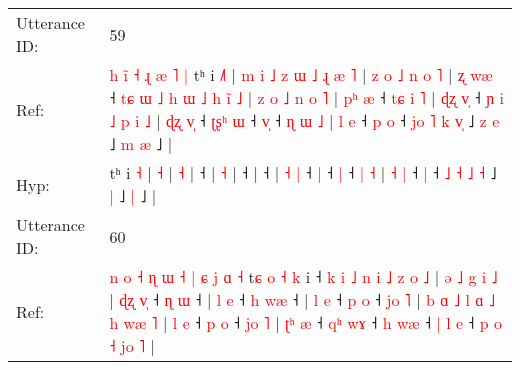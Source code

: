 \documentclass[10pt]{article}
\DeclareRobustCommand{\hl}[1]{{\textcolor{red}{#1}}}
\begin{document}
\begin{longtable}{ll}
 \\
\midrule
Utterance ID: & 59 \\
Ref: & \hl{h}\hl{ }\hl{i}\hl{̃}\hl{ }\hl{˧}\hl{ }\hl{ɻ}\hl{ }\hl{æ}\hl{ }\hl{˥}\hl{ }\hl{|}\hl{ }tʰ i \hl{˩}\hl{˥} |\hl{ }\hl{m}\hl{ }\hl{i}\hl{ }\hl{˩}\hl{ }\hl{z}\hl{ }\hl{ɯ}\hl{ }\hl{˩}\hl{ }\hl{ɻ}\hl{ }\hl{æ} \hl{˥} |\hl{ }\hl{z}\hl{ }\hl{o}\hl{ }\hl{˩}\hl{ }\hl{n}\hl{ }\hl{o} \hl{˥} |\hl{ }\hl{ʐ}\hl{ }\hl{w}\hl{æ} ˧\hl{ }\hl{t}\hl{ɕ}\hl{ }\hl{ɯ}\hl{ }\hl{˩}\hl{ }\hl{h}\hl{ }\hl{ɯ}\hl{ }\hl{˩}\hl{ }\hl{h}\hl{ }\hl{i}\hl{̃}\hl{ }\hl{˩} |\hl{ }\hl{z}\hl{ }\hl{o}\hl{ }\hl{˩}\hl{ }\hl{n}\hl{ }\hl{o} \hl{˥} |\hl{ }\hl{p}\hl{ʰ}\hl{ }\hl{æ} ˧\hl{ }\hl{t}\hl{ɕ}\hl{ }\hl{i}\hl{ }\hl{˥} |\hl{ }\hl{ɖ}\hl{ʐ}\hl{ }\hl{v}\hl{̩} ˧\hl{ }\hl{ɲ}\hl{ }\hl{i}\hl{ }\hl{˩}\hl{ }\hl{p}\hl{ }\hl{i}\hl{ }\hl{˩} | \hl{ɖ}\hl{ʐ} \hl{v}\hl{̩} ˧\hl{ }\hl{ʈ}\hl{ʂ}\hl{ʰ} \hl{ɯ} ˧ \hl{v}\hl{̩} ˧\hl{ }\hl{ɳ} \hl{ɯ} \hl{˩} | \hl{l} \hl{e} ˧\hl{ }\hl{p} \hl{o} ˧ \hl{j}\hl{o} \hl{˥} \hl{k} \hl{v}\hl{̩} ˩\hl{ }\hl{z} \hl{e} ˩\hl{ }\hl{m} \hl{æ} ˩ |
 \\
Hyp: & \hl{}\hl{}\hl{}\hl{}\hl{}\hl{}\hl{}\hl{}\hl{}\hl{}\hl{}\hl{}\hl{}\hl{}\hl{}tʰ i \hl{}\hl{˧} |\hl{}\hl{}\hl{}\hl{}\hl{}\hl{}\hl{}\hl{}\hl{}\hl{}\hl{}\hl{}\hl{}\hl{}\hl{}\hl{} \hl{˧} |\hl{}\hl{}\hl{}\hl{}\hl{}\hl{}\hl{}\hl{}\hl{}\hl{} \hl{˧} |\hl{}\hl{}\hl{}\hl{}\hl{} ˧\hl{}\hl{}\hl{}\hl{}\hl{}\hl{}\hl{}\hl{}\hl{}\hl{}\hl{}\hl{}\hl{}\hl{}\hl{}\hl{}\hl{}\hl{}\hl{}\hl{} |\hl{}\hl{}\hl{}\hl{}\hl{}\hl{}\hl{}\hl{}\hl{}\hl{} \hl{˧} |\hl{}\hl{}\hl{}\hl{}\hl{} ˧\hl{}\hl{}\hl{}\hl{}\hl{}\hl{}\hl{} |\hl{}\hl{}\hl{}\hl{}\hl{}\hl{} ˧\hl{}\hl{}\hl{}\hl{}\hl{}\hl{}\hl{}\hl{}\hl{}\hl{}\hl{}\hl{} | \hl{}\hl{˧} \hl{}\hl{|} ˧\hl{}\hl{}\hl{}\hl{} \hl{|} ˧ \hl{}\hl{|} ˧\hl{}\hl{} \hl{|} \hl{˧} | \hl{˧} \hl{|} ˧\hl{}\hl{} \hl{|} ˧ \hl{}\hl{˩} \hl{˧} \hl{˩} \hl{}\hl{˧} ˩\hl{}\hl{} \hl{|} ˩\hl{}\hl{} \hl{|} ˩ |
 \\
\midrule
Utterance ID: & 60 \\
Ref: & \hl{n}\hl{ }\hl{o}\hl{ }\hl{˧}\hl{ }\hl{ɳ}\hl{ }\hl{ɯ}\hl{ }\hl{˧}\hl{ }\hl{|}\hl{ }\hl{ɕ}\hl{ }\hl{j}\hl{ }\hl{ɑ}\hl{ }\hl{˧}\hl{ }t\hl{ɕ}\hl{ }\hl{o}\hl{ }\hl{˧}\hl{ }\hl{k} i ˧\hl{ }\hl{k}\hl{ }\hl{i}\hl{ }\hl{˩}\hl{ }\hl{n}\hl{ }\hl{i}\hl{ }\hl{˩}\hl{ }\hl{z}\hl{ }\hl{o}\hl{ }\hl{˩} |\hl{ }\hl{ə}\hl{ }\hl{˩}\hl{ }\hl{g}\hl{ }\hl{i} \hl{˩} |\hl{ }\hl{ɖ}\hl{ʐ}\hl{ }\hl{v}\hl{̩} ˧\hl{ }\hl{ɳ} \hl{ɯ} ˧ |\hl{ }\hl{l}\hl{ }\hl{e} ˧\hl{ }\hl{h} \hl{w}\hl{æ} ˧ |\hl{ }\hl{l}\hl{ }\hl{e} ˧\hl{ }\hl{p} \hl{o} ˧\hl{ }\hl{j}\hl{o}\hl{ }\hl{˥} |\hl{ }\hl{b}\hl{ }\hl{ɑ}\hl{ }\hl{˩}\hl{ }\hl{l}\hl{ }\hl{ɑ}\hl{ }\hl{˩}\hl{ }\hl{h}\hl{ }\hl{w}\hl{æ} \hl{˥} |\hl{ }\hl{l}\hl{ }\hl{e} ˧\hl{ }\hl{p} \hl{o} ˧\hl{ }\hl{j}\hl{o}\hl{ }\hl{˥} |\hl{ }\hl{ʈ}\hl{ʰ}\hl{ }\hl{æ} ˧\hl{ }\hl{q}\hl{ʰ} \hl{w}\hl{ɤ} ˧\hl{ }\hl{h} \hl{w}\hl{æ} ˧ \hl{|} \hl{l} \hl{e} ˧ \hl{p} \hl{o} \hl{˧} \hl{j}\hl{o} \hl{˥} |

\end{longtable}
\end{document}
